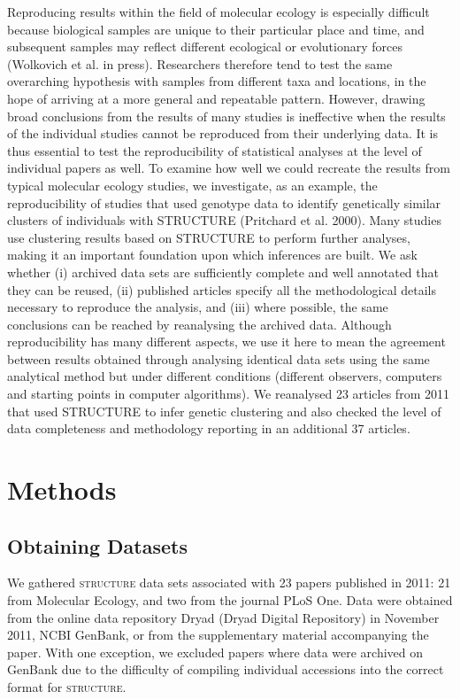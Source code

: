 Reproducing results within the field of molecular ecology is especially difficult because biological samples are unique to their particular place and time, and subsequent samples may reflect different ecological or evolutionary forces (Wolkovich et al. in press). Researchers therefore tend to test the same overarching hypothesis with samples from different taxa and locations, in the hope of arriving at a more general and repeatable pattern. However, drawing broad conclusions from the results of many studies is ineffective when the results of the individual studies cannot be reproduced from their underlying data. It is thus essential to test the reproducibility of statistical analyses at the level of individual papers as well. To examine how well we could recreate the results from typical molecular ecology studies, we investigate, as an example, the reproducibility of studies that used genotype data to identify genetically similar clusters of individuals with STRUCTURE (Pritchard et al. 2000). Many studies use clustering results based on STRUCTURE to perform further analyses, making it an important foundation upon which inferences are built. We ask whether (i) archived data sets are sufficiently complete and well annotated that they can be reused, (ii) published articles specify all the methodological details necessary to reproduce the analysis, and (iii) where possible, the same conclusions can be reached by reanalysing the archived data. Although reproducibility has many different aspects, we use it here to mean the agreement between results obtained through analysing identical data sets using the same analytical method but under different conditions (different observers, computers and starting points in computer algorithms). We reanalysed 23 articles from 2011 that used STRUCTURE to infer genetic clustering and also checked the level of data completeness and methodology reporting in an additional 37 articles.

\section{Methods}
\subsection{Obtaining Datasets}
We gathered \textsc{structure} data sets associated with 23 papers published in 2011: 21 from Molecular Ecology, and two from the journal PLoS One. Data were obtained from the online data repository Dryad (Dryad Digital Repository) in November 2011, NCBI GenBank, or from the supplementary material accompanying the paper. With one exception, we excluded papers where data were archived on GenBank due to the difficulty of compiling individual accessions into the correct format for \textsc{structure}.

